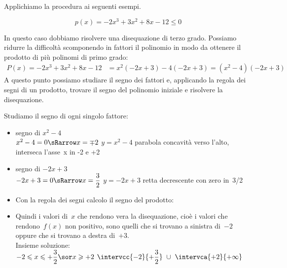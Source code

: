 Applichiamo la procedura ai seguenti esempi.

\newpage %

\begin{esempio}
 \[p(x)=-2x^3+3x^2+8x-12 \leqslant 0\]

In questo caso dobbiamo risolvere una disequazione di terzo grado. 
Possiamo ridurre la difficoltà scomponendo in fattori il polinomio in modo da 
ottenere il prodotto di più polinomi di primo grado:
\begin{align*}
P(x) = -2x^3+3x^2+8x-12 &= x^2(-2x+3)-4(-2x+3) = (x^2-4)(-2x+3)
\end{align*}
A questo punto possiamo studiare il segno dei fattori e, applicando la regola 
dei segni di un prodotto, trovare il segno del polinomio iniziale e risolvere 
la disequazione.

Studiamo il segno di ogni singolo fattore:
\begin{itemize}

 \item segno di \(x^2-4\)\\
 \segnofatt
   {\(x^2-4=0 \sRarrow x=\mp 2\)}
   {\(y=x^2-4\)}
   {parabola concavità verso l'alto, interseca l'asse~x in -2 e +2}
   {}
 \item  segno di \(-2x+3\)\\
 \segnofatt
   {\(-2x+3=0 \sRarrow x=\dfrac{3}{2}\)}
   {\(y=-2x+3\)}
   {retta decrescente con zero in~3/2}
   {}
 \item 
 \vspace{-1em} 
 Con la regola dei segni calcolo il segno del prodotto:
 \vspace{-1em}

\begin{inaccessibleblock}
  \begin{center}
  \segnoprodottoa
  \end{center}
\end{inaccessibleblock}

 \item 
 \vspace{-1em}
 Quindi i valori di~\(x\) che rendono vera la disequazione, cioè i 
valori che rendono~\(f(x)\) non positivo, sono quelli 
che si trovano a sinistra di~\(-2\) oppure che si trovano a destra 
di~\(+3\).\\
Insieme soluzione: \\
 \insiemesoluzione
   {\solprodottoa}
   {\(-2 \leqslant x \leqslant +\dfrac{3}{2} \sor x \geqslant +2\)}
   {\(\intervcc{-2}{+\dfrac{3}{2}}~\cup~\intervca{+2}{+\infty}\)}
\end{itemize}
\end{esempio}

